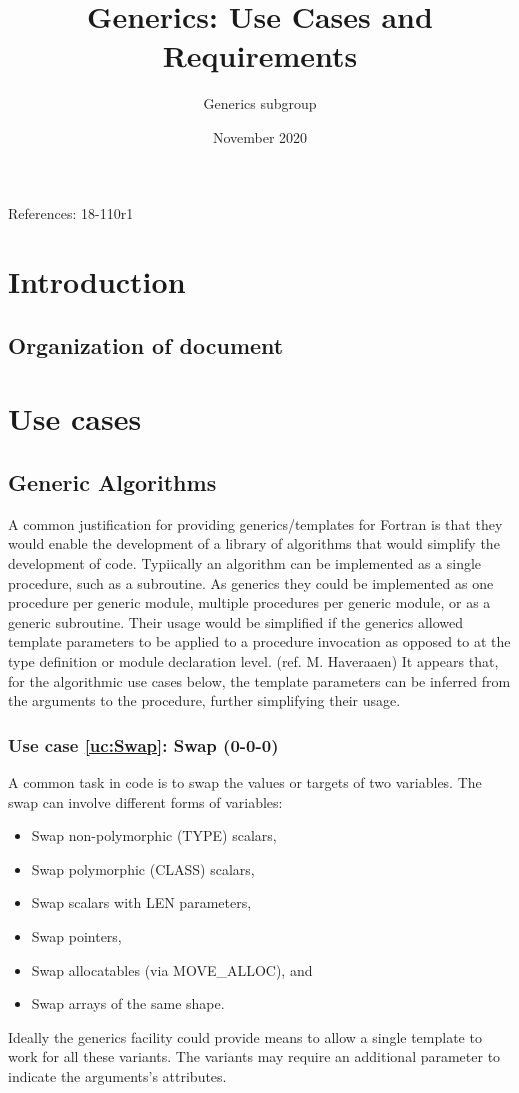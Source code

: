 \documentclass{article}
\title{Generics: Use Cases and Requirements}
\author{Generics subgroup}
\date{November 2020}
\newcounter{usecase}
\newcommand{\newusecase}[2]{
\refstepcounter{usecase}\label{uc:#1}
\subsubsection{Use case \ref{uc:#1}: #1 (#2)}}
\begin{document}
\maketitle
References: 18-110r1

\section{Introduction}
\subsection{Organization of document}

\section{Use cases}

\subsection{Generic Algorithms}

A common justification for providing generics/templates for Fortran is
that they would enable the development of a library of algorithms that
would simplify the development of code.
Typiically an algorithm can be implemented as a single procedure,
such as a subroutine. As generics they could be implemented as one
procedure per generic module, multiple procedures per generic
module, or as a generic subroutine.
Their usage would be simplified if the generics allowed template
parameters to be applied to a procedure invocation as opposed to at
the type definition or module declaration level.  (ref. M. Haveraaen)
It appears that, for the algorithmic use cases below, the template
parameters can be inferred from the arguments to the procedure,
further simplifying their usage.

\newusecase{Swap}{0-0-0}

A common task in code is to swap the values or targets of two
variables. The swap can involve different forms of variables:
\begin{itemize}
\item Swap non-polymorphic (TYPE) scalars,
\item Swap polymorphic (CLASS) scalars,
\item Swap scalars with LEN parameters,
\item Swap pointers,
\item Swap allocatables (via {\rm MOVE\_ALLOC}), and
\item Swap arrays of the same shape.
\end{itemize}
Ideally the generics facility could provide means to allow a single template to work for all these variants.   The variants may require an additional parameter to indicate the arguments's attributes.
\end{document}
